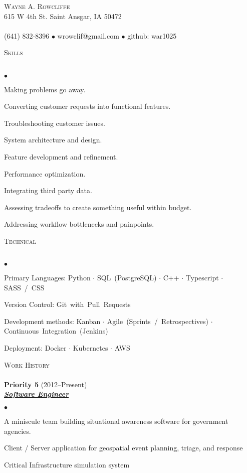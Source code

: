 \documentclass{article}
\newcommand{\lineunder} {
	\vspace*{-8pt} \\ \hspace*{-18pt} \hrulefill \\
}
\newcommand{\header}[1] {
	{\hspace*{-15pt}\vspace*{6pt} \textsc{#1}} \vspace*{-6pt} \lineunder
}
\newcommand{\employer}[3] {
	{ \textbf{#1} (#2)\\ \underline{\textbf{\emph{#3}}}\\  }
}
\newcommand{\contact}[4] {
	\vspace*{-8pt}\begin{center}{\LARGE \scshape {#1}}\\#2 \lineunder#3 $\bullet$ #4\end{center}\vspace*{-8pt}
}
\newenvironment{achievements} {
	\begin{list}{$\bullet$}
		{\topsep 0pt \itemsep -2pt}
	}{
		\vspace*{4pt}\end{list}
	}
\newcommand{\subject}[1] {\mbox{#1} $\cdot$}
\newcommand{\lastsubject}[1] {\mbox{#1}}
\begin{document}
\small
\smallskip
\vspace*{-44pt}

\contact{Wayne A. Rowcliffe}
{615 W 4th St. Saint Ansgar, IA 50472}
{(641) 832-8396 $\bullet$ wrowclif@gmail.com}%
{github: war1025}

\header{Skills}

	\begin{achievements}
      \item{Making problems go away.}
      \item{Converting customer requests into functional features.}
      \item{Troubleshooting customer issues.}
      \item{System architecture and design.}
      \item{Feature development and refinement.}
      \item{Performance optimization.}
      \item{Integrating third party data.}
      \item{Assessing tradeoffs to create something useful within budget.}
      \item{Addressing workflow bottlenecks and painpoints.}
   \end{achievements}

\header{Technical}

   \begin{achievements}
		\item{Primary Languages:
			\subject{Python}
         \subject{SQL (PostgreSQL)}
			\subject{C++}
			\subject{Typescript}
			\lastsubject{SASS / CSS}
		}
      \item{Version Control:
         \lastsubject{Git with Pull Requests}
      }
      \item{Development methods:
         \subject{Kanban}
         \subject{Agile (Sprints / Retrospectives)}
         \lastsubject{Continuous Integration (Jenkins)}
      }
      \item{Deployment:
         \subject{Docker}
         \subject{Kubernetes}
         \lastsubject{AWS}
      }
	\end{achievements}

\header{Work History}

	\employer{Priority 5}{2012--Present}{Software Engineer}
		\begin{achievements}
         \item{A miniscule team building situational awareness software for government agencies.}
         \item{Client / Server application for geospatial event planning, triage, and response}
         \item{Critical Infrastructure simulation system}
		\end{achievements}
\end{document}
